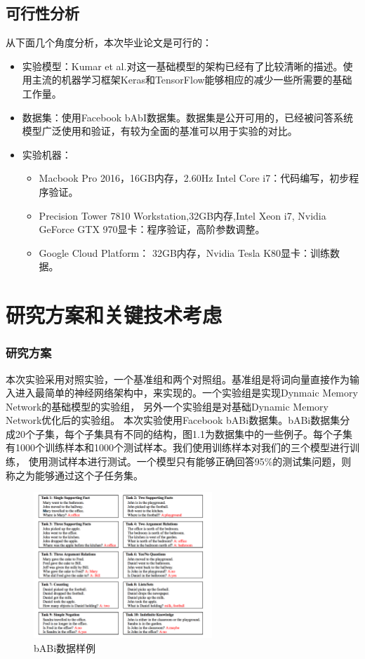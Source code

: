 \section{可行性分析}
从下面几个角度分析，本次毕业论文是可行的：
\begin{itemize}
\item 实验模型：Kumar et al.\cite{DBLP:journals/corr/KumarISBEPOGS15}对这一基础模型的架构已经有了比较清晰的描述。使用主流的机器学习框架Keras和TensorFlow能够相应的减少一些所需要的基础工作量。
\item 数据集：使用Facebook bAbI数据集。数据集是公开可用的，已经被问答系统模型广泛使用和验证，有较为全面的基准可以用于实验的对比。
\item 实验机器：
    \begin{itemize}
    \item Macbook Pro 2016，16GB内存，2.60Hz Intel Core i7：代码编写，初步程序验证。
    \item Precision Tower 7810 Workstation,32GB内存,Intel Xeon i7, Nvidia GeForce GTX 970显卡：程序验证，高阶参数调整。
    \item Google Cloud Platform： 32GB内存，Nvidia Tesla K80显卡：训练数据。 
    \end{itemize}
\end{itemize}
\chapter{研究方案和关键技术考虑}
\subsection{研究方案}
本次实验采用对照实验，一个基准组和两个对照组。基准组是将词向量直接作为输入进入最简单的神经网络架构中，来实现的。一个实验组是实现Dynmaic Memory Network的基础模型的实验组，
另外一个实验组是对基础Dynamic Memory Network优化后的实验组。
本次实验使用Facebook bABi数据集。bABi数据集分成20个子集，每个子集具有不同的结构，图1.1为数据集中的一些例子\cite{DBLP:journals/corr/WestonBCM15}。每个子集有1000个训练样本和1000个测试样本。我们使用训练样本对我们的三个模型进行训练，
使用测试样本进行测试。一个模型只有能够正确回答95\%的测试集问题，则称之为能够通过这个子任务集。
\begin{figure}[h]
    \centering
    \includegraphics[width=0.6\textwidth]{./images/dataset-example}
      \caption{bABi数据样例}
    \end{figure} 
